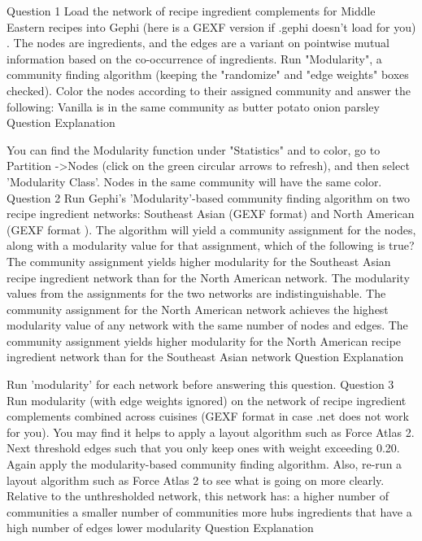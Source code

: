 Question 1
Load the network of recipe ingredient complements for Middle Eastern recipes into Gephi (here is a GEXF version if .gephi doesn't load for you) . The nodes are ingredients, and the edges are a variant on pointwise mutual information based on the co-occurrence of ingredients. Run "Modularity", a community finding algorithm (keeping the "randomize" and "edge weights" boxes checked). Color the nodes according to their assigned community and answer the following: 
Vanilla is in the same community as
butter
potato
onion
parsley
Question Explanation

You can find the Modularity function under "Statistics" and to color, go to Partition ->Nodes (click on the green circular arrows to refresh), and then select 'Modularity Class'. Nodes in the same community will have the same color.
Question 2
Run Gephi's 'Modularity'-based community finding algorithm on two recipe ingredient networks: Southeast Asian (GEXF format) and North American (GEXF format ). The algorithm will yield a community assignment for the nodes, along with a modularity value for that assignment, which of the following is true?
The community assignment yields higher modularity for the Southeast Asian recipe ingredient network than for the North American network.
The modularity values from the assignments for the two networks are indistinguishable.
The community assignment for the North American network achieves the highest modularity value of any network with the same number of nodes and edges.
The community assignment yields higher modularity for the North American recipe ingredient network than for the Southeast Asian network
Question Explanation

Run 'modularity' for each network before answering this question.
Question 3
Run modularity (with edge weights ignored) on the network of recipe ingredient complements combined across cuisines (GEXF format in case .net does not work for you). You may find it helps to apply a layout algorithm such as Force Atlas 2. Next threshold edges such that you only keep ones with weight exceeding 0.20. Again apply the modularity-based community finding algorithm. Also, re-run a layout algorithm such as Force Atlas 2 to see what is going on more clearly. Relative to the unthresholded network, this network has:
a higher number of communities
a smaller number of communities
more hubs ingredients that have a high number of edges
lower modularity
Question Explanation

